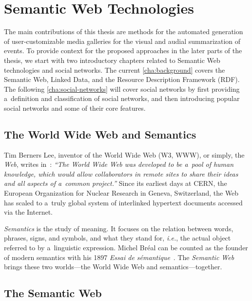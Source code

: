 \chapter{Semantic Web Technologies}
\label{cha:background}

\ifpdf
    \graphicspath{{2_background/figures/PNG/}{2_background/figures/PDF/}{2_background/figures/}}
\else
    \graphicspath{{2_background/figures/EPS/}{2_background/figures/}}
\fi

The main contributions of this thesis
are methods for the automated generation of
user-customizable media galleries
for the visual and audial summarization of events.
To provide context for the proposed approaches
in the later parts of the thesis,
we start with two introductory chapters
related to Semantic Web technologies
and social networks.
The current \autoref{cha:background} covers
the Semantic Web, Linked Data,
and the Resource Description Framework (RDF).
The following \autoref{cha:social-networks}
will cover social networks
by first providing a~definition
and classification of social networks,
and then introducing popular social networks
and some of their core features.

\section{The World Wide Web and Semantics}

Tim Berners Lee, inventor of the World Wide Web (W3, WWW),
or simply, the \emph{Web},
writes in~\cite{bernerslee1994worldwideweb}:
\textit{``The World Wide Web was developed
to be a~pool of human knowledge,
which would allow collaborators
in remote sites to share their ideas
and all aspects of a~common project.''}
Since its earliest days at CERN,
the European Organization for Nuclear Research
in Geneva, Switzerland,
the Web has scaled to a~truly global system
of interlinked hypertext documents
accessed via the Internet.

\emph{Semantics} is the study of meaning.
It focuses on the relation between
words, phrases, signs, and symbols,
and what they stand for, \emph{i.e.},
the actual object referred to by a~linguistic expression.
Michel Bréal can be counted as the founder
of modern semantics with his 1897
\emph{Essai de sémantique}~\cite{breal1897essai}.
The \emph{Semantic Web} brings these two worlds---the
World Wide Web and semantics---together.

\section{The Semantic Web}

